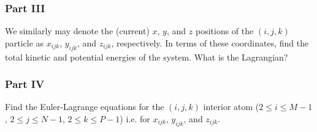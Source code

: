 \documentclass[letterpaper,12pt]{article}
\begin{document}
\begin{flushleft}
    \subsubsection*{Part III}
    We similarly may denote the (current) $x$, $y$, and $z$ positions of the $(i, j, k)$ particle as $x_{ijk}$, $y_{ijk}$, and $z_{ijk}$, respectively. In terms of these coordinates, find the total kinetic and potential energies of the system. What is the Lagrangian?

    \subsubsection*{Part IV}
    Find the Euler-Lagrange equations for the $(i, j, k)$ interior atom ($2 \leq i \leq M-1$, $2 \leq j \leq N-1$, $2 \leq k \leq P-1$) i.e. for $x_{ijk}$, $y_{ijk}$, and $z_{ijk}$.

\end{flushleft}
\end{document}
